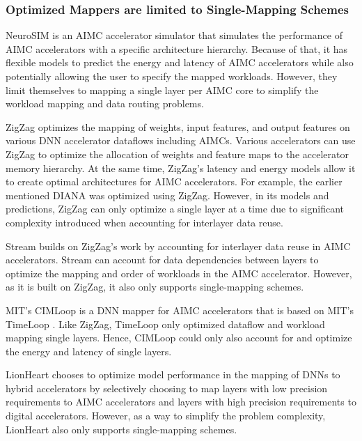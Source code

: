 \subsubsection{Optimized Mappers are limited to Single-Mapping Schemes}

NeuroSIM \cite{chen2018neurosim} is an AIMC accelerator simulator that simulates the performance of AIMC accelerators with a specific architecture hierarchy. Because of that, it has flexible models to predict the energy and latency of AIMC accelerators while also potentially allowing the user to specify the mapped workloads. However, they limit themselves to mapping a single layer per AIMC core to simplify the workload mapping and data routing problems.

ZigZag \cite{mei2021zigzag} optimizes the mapping of weights, input features, and output features on various DNN accelerator dataflows including AIMCs. Various accelerators can use ZigZag to optimize the allocation of weights and feature maps to the accelerator memory hierarchy. At the same time, ZigZag's latency and energy models allow it to create optimal architectures for AIMC accelerators. For example, the earlier mentioned DIANA \cite{houshmand2022diana} was optimized using ZigZag. However, in its models and predictions, ZigZag can only optimize a single layer at a time due to significant complexity introduced when accounting for interlayer data reuse. 

Stream \cite{symons2024stream} builds on ZigZag's work by accounting for interlayer data reuse in AIMC accelerators. Stream can account for data dependencies between layers to optimize the mapping and order of workloads in the AIMC accelerator. However, as it is built on ZigZag, it also only supports single-mapping schemes.

MIT's CIMLoop \cite{andrulis2024cimloop} is a DNN mapper for AIMC accelerators that is based on MIT's TimeLoop \cite{parashar2019timeloop}. Like ZigZag, TimeLoop only optimized dataflow and workload mapping single layers. Hence, CIMLoop could only also account for and optimize the energy and latency of single layers.

LionHeart \cite{lammie2024lionheart} chooses to optimize model performance in the mapping of DNNs to hybrid accelerators by selectively choosing to map layers with low precision requirements to AIMC accelerators and layers with high precision requirements to digital accelerators. However, as a way to simplify the problem complexity, LionHeart also only supports single-mapping schemes. 

